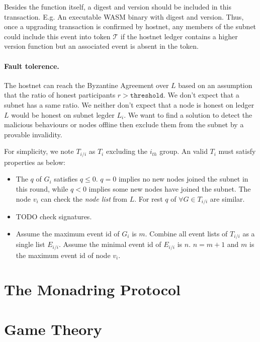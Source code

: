 \documentclass[11pt]{article}
\begin{document}
Besides the function itself, a digest and version should be included in this transaction. E.g. An executable WASM binary with digest and version.
Thus, once a upgrading transaction is confirmed by hostnet, any members of the subnet could include this event into token $\mathcal{T}$ if the hostnet ledger contains a higher version function but an associated event is absent in the token.

\paragraph{Fault tolerence.}
The hostnet can reach the Byzantine Agreement over $L$ based on an assumption that the ratio of honest participants $r > \texttt{threshold}$.
We don{'}t expect that a subnet has a same ratio. We neither don{'}t expect that a node is honest on ledger $L$ would be honest on subnet legder $L_{i}$.
We want to find a solution to detect the malicious behaviours or nodes offline then exclude them from the subnet by a provable invalidity.

For simplicity, we note $T_{i/i}$ as $T_{i}$ excluding the $i_{th}$ group. An valid $T_{i}$ must satisfy properties as below:

\begin{itemize}
\item The $q$ of $G_{i}$ satisfies \(q \leq 0\). $q=0$ implies no new nodes joined the subnet in this round, while $q < 0$ implies some new nodes have joined the subnet. The node $v_{i}$ can check the \textit{node list} from $L$.
For rest $q$ of $\forall G \in T_{i/i}$ are similar.
\item TODO check signatures.
\item Assume the maximum event id of $G_{i}$ is $m$. Combine all event lists of $T_{i/i}$ as a single list $E_{i/i}$. Assume the minimal event id of $E_{i/i}$ is $n$.
\(n = m+1\) and $m$ is the maximum event id of node $v_{i}$.
\end{itemize}

\section{The Monadring Protocol}

\section{Game Theory}
\end{document}
